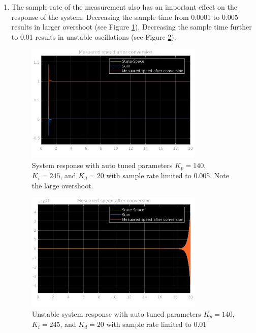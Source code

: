 \documentclass{journal}
\begin{document}
\begin{enumerate}[label=(\alph*)]
	\item %
	The sample rate of the measurement also has an important effect on the response of the system.  Decreasing the sample time from 0.0001 to 0.005 results in larger overshoot (see Figure \ref{fig:Lab1PID_sr0.005}).  Decreasing the sample time further to 0.01 results in unstable oscillations (see Figure \ref{fig:Lab1PID_sr0.01}).

	\begin{figure}[H]
		\centering
		\includegraphics[width = 0.8\textwidth]{Lab1PID_0SR005.jpg}
		\caption{System response with auto tuned parameters $K_p = 140$, $K_i = 245$, and $K_d = 20$ with sample rate limited to 0.005.  Note the large overshoot.}
		\label{fig:Lab1PID_sr0.005}
	\end{figure}

	\begin{figure}[H]
		\centering
		\includegraphics[width = 0.8\textwidth]{Lab1PID_0SR01.jpg}
		\caption{Unstable system response with auto tuned parameters $K_p = 140$, $K_i = 245$, and $K_d = 20$ with sample rate limited to 0.01}
		\label{fig:Lab1PID_sr0.01}
	\end{figure}


\end{enumerate}
\end{document}
